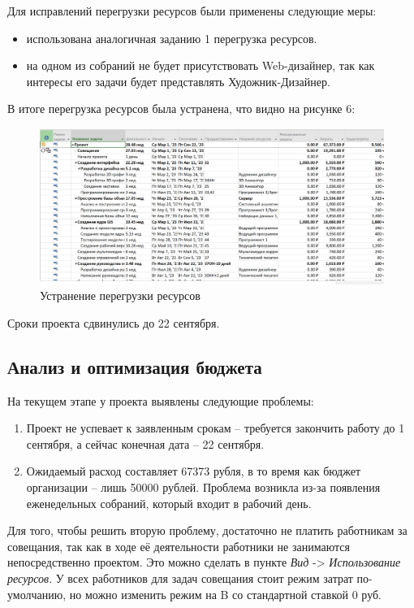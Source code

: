 Для исправлений перегрузки ресурсов были применены следующие меры:
\begin{itemize}
	\item использована аналогичная заданию 1 перегрузка ресурсов.
	\item на одном из собраний не будет присутствовать Web-дизайнер, так как интересы его задачи будет представлять Художник-Дизайнер.
\end{itemize}

В итоге перегрузка ресурсов была устранена, что видно на рисунке 6:
\FloatBarrier
\begin{figure}[h]	
	\begin{center}
		\includegraphics[width=\linewidth]{inc/after.png}
	\end{center}
	\captionsetup{justification=centering}
	\caption{Устранение перегрузки ресурсов}
\end{figure}
\FloatBarrier 

Сроки проекта сдвинулись до 22 сентября.

\subsection*{Анализ и оптимизация бюджета}
На текущем этапе у проекта выявлены следующие проблемы:
\begin{enumerate}
	\item Проект не успевает к заявленным срокам -- требуется закончить работу до 1 сентября, а сейчас конечная дата -- 22 сентября.
	\item Ожидаемый расход составляет 67373 рубля, в то время как бюджет организации -- лишь 50000 рублей. 
	Проблема возникла из-за появления еженедельных собраний, который входит в рабочий день.
\end{enumerate}

Для того, чтобы решить вторую проблему, достаточно не платить работникам за совещания, так как в ходе её деятельности работники не занимаются непосредственно проектом.
Это можно сделать в пункте \textit{Вид} -> \textit{Использование ресурсов}. 
У всех работников для задач совещания стоит режим затрат по-умолчанию, но можно изменить режим на B со стандартной ставкой 0 руб.

